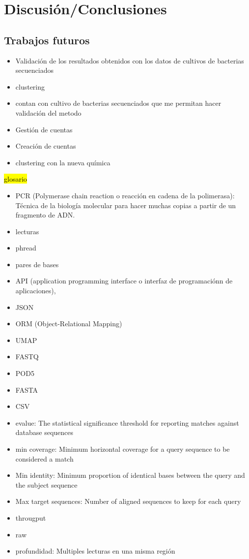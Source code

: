 \chapter{Discusión/Conclusiones}

\section{Trabajos futuros}
\begin{itemize}
    \item Validación de los resultados obtenidos con los datos de cultivos de bacterias secuenciados
    \item clustering
    \item contan con cultivo de bacterias secuenciados que me permitan hacer validación del metodo
    \item Gestión de cuentas
    \item Creación de cuentas
    \item clustering con la nueva química   
\end{itemize}
\hl{glosario}
\begin{itemize}
    \item PCR (Polymerase chain reaction o reacción en cadena de la polimerasa): Técnica de la biología molecular para hacer muchas copias a partir de un fragmento de ADN.
    \item lecturas
    \item phread
    \item pares de bases
    \item API (application programming interface o interfaz de programaciónn de aplicaciones),
    \item JSON
    \item ORM (Object-Relational Mapping)
    \item UMAP
    \item FASTQ
    \item POD5
    \item FASTA
    \item CSV
    \item evalue: The statistical significance threshold for reporting matches against database sequences
    \item min coverage: Minimum horizontal coverage for a query sequence to be considered a match
    \item Min identity: Minimum proportion of identical bases between the query and the subject sequence
    \item Max target sequences: Number of aligned sequences to keep for each query
    \item througput
    \item raw
    \item profundidad: Multiples lecturas en una misma región
\end{itemize}
